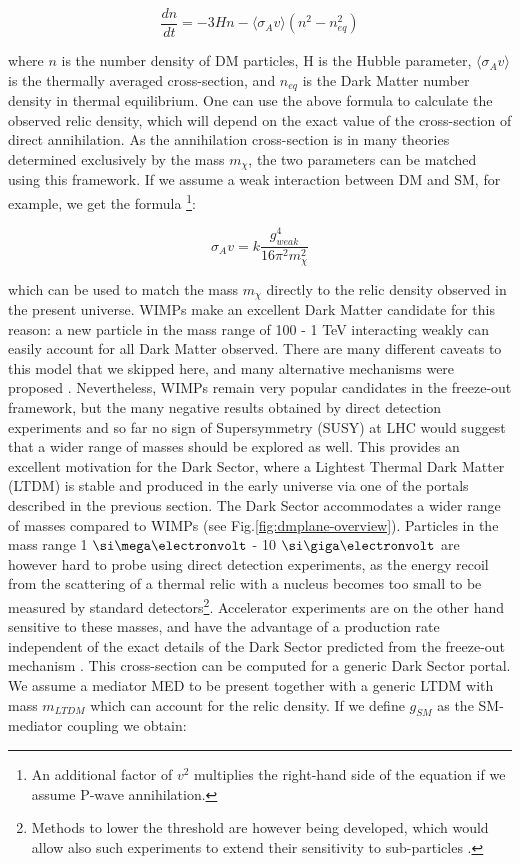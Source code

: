   \begin{equation}
    \label{eq:boltzman-equation}
    \frac{d n}{d t} = -3 H n - \langle \sigma_A v \rangle (n^2 - n^2_{eq})
  \end{equation}

  where $n$ is the number density of DM particles, H is the Hubble parameter,  $\langle \sigma_A v \rangle$ is the thermally averaged cross-section, and $n_{eq}$ is the Dark Matter number density in thermal equilibrium. One can use the above formula to calculate the observed relic density, which will depend on the exact value of the cross-section of direct annihilation. As the annihilation cross-section is in many theories determined exclusively by the mass $m_{\chi}$, the two parameters can be matched using this framework. If we assume a weak interaction between DM and SM, for example, we get the formula \cite{Feng:2010gw}\footnote{An additional factor of $v^2$ multiplies the right-hand side of the equation if we assume P-wave annihilation.}:

  \begin{equation}
    \label{eq:dm-fo-sigma}
    \sigma_A v = k \frac{g^4_{weak}}{16 \pi^2 m^2_{\chi}}
  \end{equation}

  which can be used to match the mass $m_{\chi}$ directly to the relic density observed in the present universe. WIMPs make an excellent Dark Matter candidate for this reason: a new particle in the mass range of 100 \gev - 1 \si{\tera\electronvolt} interacting weakly can easily account for all Dark Matter observed. There are many different caveats to this model that we skipped here, and many alternative mechanisms were proposed \cite{Hall:2009bx,Feng:2010gw,Marsh:2015xka,Griest:1990kh,Arcadi:2017kky}. Nevertheless, WIMPs remain very popular candidates in the freeze-out framework, but the many negative results obtained by direct detection experiments and so far no sign of Supersymmetry (SUSY) at LHC would suggest that a wider range of masses should be explored as well. This provides an excellent motivation for the Dark Sector, where a Lightest Thermal Dark Matter (LTDM) is stable and produced in the early universe via one of the portals described in the previous section. The Dark Sector accommodates a wider range of masses compared to WIMPs (see Fig.\ref{fig:dmplane-overview}). Particles in the mass range 1 $\mev$ - 10 $\gev$ are however hard to probe using direct detection experiments, as the energy recoil from the scattering of a thermal relic with a nucleus becomes too small to be measured by standard detectors\footnote{Methods to lower the threshold are however being developed, which would allow also such experiments to extend their sensitivity to sub-\gev particles \cite{Baracchini:2020nut}.}. Accelerator experiments are on the other hand sensitive to these masses, and have the advantage of a production rate independent of the exact details of the Dark Sector predicted from the freeze-out mechanism \cite{battaglieri2017cosmic}. This cross-section can be computed for a generic Dark Sector portal. We assume a mediator MED to be present together with a generic LTDM with mass $m_{LTDM}$ which can account for the relic density. If we define $g_{SM}$ as the SM-mediator coupling we obtain:

